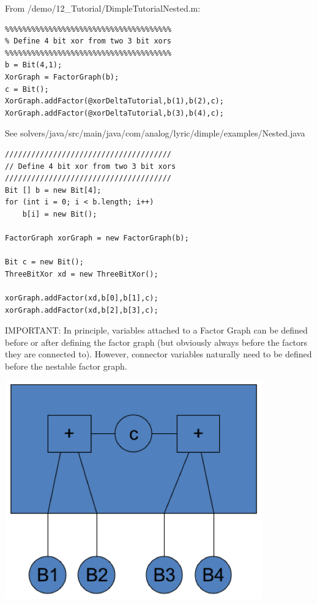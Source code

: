 \ifmatlab

From /demo/12\_Tutorial/DimpleTutorialNested.m:


\begin{lstlisting}
%%%%%%%%%%%%%%%%%%%%%%%%%%%%%%%%%%%%%% 
% Define 4 bit xor from two 3 bit xors 
%%%%%%%%%%%%%%%%%%%%%%%%%%%%%%%%%%%%%% 
b = Bit(4,1);
XorGraph = FactorGraph(b); 
c = Bit(); 
XorGraph.addFactor(@xorDeltaTutorial,b(1),b(2),c); 
XorGraph.addFactor(@xorDeltaTutorial,b(3),b(4),c);
\end{lstlisting}

\fi

\ifjava

See solvers/java/src/main/java/com/analog/lyric/dimple/examples/Nested.java

\begin{lstlisting}
////////////////////////////////////// 
// Define 4 bit xor from two 3 bit xors 
////////////////////////////////////// 
Bit [] b = new Bit[4];
for (int i = 0; i < b.length; i++)
	b[i] = new Bit();
		
FactorGraph xorGraph = new FactorGraph(b);
		
Bit c = new Bit(); 
ThreeBitXor xd = new ThreeBitXor();
		
xorGraph.addFactor(xd,b[0],b[1],c); 
xorGraph.addFactor(xd,b[2],b[3],c);
\end{lstlisting}
\fi

IMPORTANT: In principle, variables attached to a Factor Graph can be defined before or after defining the factor graph (but obviously always before the factors they are connected to). However, connector variables naturally need to be defined before the nestable factor graph.

\includegraphics{images/BoundaryVariables.png}

